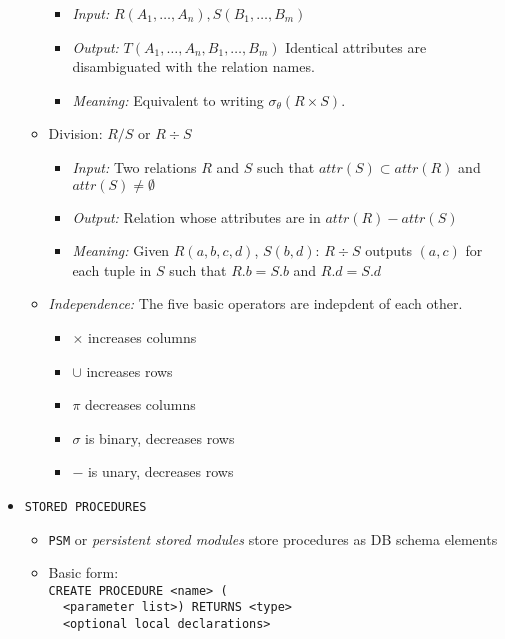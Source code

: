 \documentclass[landscape,8pt]{extarticle}
\newcommand{\code}{\lstinline}
\begin{document}
\begin{multicols}{4}
\begin{itemize}
\begin{itemize}
        \begin{itemize}
            \item \emph{Input:} $R(A_1, \dots, A_n), S(B_1, \dots, B_m)$
            \item \emph{Output:} $T(A_1, \dots, A_n, B_1, \dots, B_m)$ Identical attributes are
            disambiguated with the relation names.
            \item \emph{Meaning:} Equivalent to writing $\sigma_{\theta}(R \times S)$.
        \end{itemize}
        \item Division: $R/S$ or $R \div S$
        \begin{itemize}
            \item \emph{Input:} Two relations $R$ and $S$ such that $attr(S) \subset attr(R)$ and
            $attr(S) \neq \emptyset$
            \item \emph{Output:} Relation whose attributes are in $attr(R) - attr(S)$
            \item \emph{Meaning:} Given $R(a,b,c,d)$, $S(b,d)$: $R \div S$ outputs $(a,c)$ for each
            tuple in $S$ such that $R.b = S.b$ and $R.d = S.d$
        \end{itemize}
        \item \emph{Independence:} The five basic operators are indepdent of each other.
        \begin{itemize}
            \item $\times$ increases columns
            \item $\cup$ increases rows
            \item $\pi$ decreases columns
            \item $\sigma$ is binary, decreases rows
            \item $-$ is unary, decreases rows
        \end{itemize}
    \end{itemize}
    \item \code{STORED PROCEDURES}
    \begin{itemize}
        \item \code{PSM} or \emph{persistent stored modules} store procedures as DB schema elements
        \item Basic form:\\
\code{CREATE PROCEDURE <name> (}\\
\code{  <parameter list>) RETURNS <type>}\\
\code{  <optional local declarations>}\\

\end{itemize}
\end{itemize}
\end{multicols}
\end{document}
